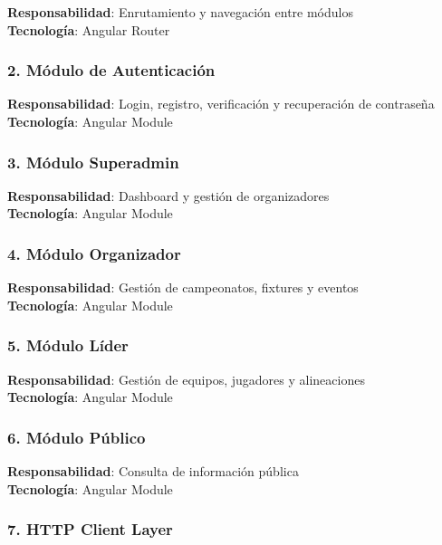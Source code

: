 \documentclass[
  spanish,
  11pt,
  letterpaper,
]{book}
\begin{document}
\textbf{Responsabilidad}: Enrutamiento y navegación entre módulos\\
\textbf{Tecnología}: Angular Router

\subsubsection{2. Módulo de
Autenticación}\label{muxf3dulo-de-autenticaciuxf3n}

\textbf{Responsabilidad}: Login, registro, verificación y recuperación
de contraseña\\
\textbf{Tecnología}: Angular Module

\subsubsection{3. Módulo Superadmin}\label{muxf3dulo-superadmin}

\textbf{Responsabilidad}: Dashboard y gestión de organizadores\\
\textbf{Tecnología}: Angular Module

\subsubsection{4. Módulo Organizador}\label{muxf3dulo-organizador}

\textbf{Responsabilidad}: Gestión de campeonatos, fixtures y eventos\\
\textbf{Tecnología}: Angular Module

\subsubsection{5. Módulo Líder}\label{muxf3dulo-luxedder}

\textbf{Responsabilidad}: Gestión de equipos, jugadores y alineaciones\\
\textbf{Tecnología}: Angular Module

\subsubsection{6. Módulo Público}\label{muxf3dulo-puxfablico}

\textbf{Responsabilidad}: Consulta de información pública\\
\textbf{Tecnología}: Angular Module

\subsubsection{7. HTTP Client Layer}\label{http-client-layer}
\end{document}
